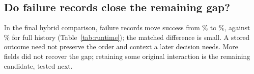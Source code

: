 \subsection{Do failure records close the remaining gap?}

In the final hybrid comparison, failure records move success from
\HybridNoFailureRate\% to \HybridRate\%, against \HybridControlRate\% for
full history (Table~\ref{tab:runtime}); the matched difference is small.
A stored outcome need not preserve the order and context a later decision
needs. More fields did not recover the gap; retaining some original
interaction is the remaining candidate, tested next.

\begin{table}[htbp]
\centering\small
\caption{Final hybrid comparison with and without failure records. Same
two panels as Table~\ref{tab:composition}. Hybrid aggregates cannot
reconstruct matched cost ratios, peak prompt, or cache hit (--).}
\label{tab:runtime}
\resizebox{\linewidth}{!}{}

\medskip
\resizebox{\linewidth}{!}{}
\end{table}
